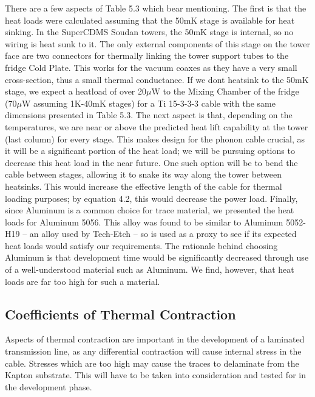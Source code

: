 \documentclass{report}
\begin{document}
\begin{table}[h]
\end{table}


There are a few aspects of Table 5.3 which bear mentioning. The first is that the heat loads were calculated assuming that the 50mK stage is available for heat sinking. In the SuperCDMS Soudan towers, the 50mK stage is internal, so no wiring is heat sunk to it. The only external components of this stage on the tower face are two connectors for thermally linking the tower support tubes to the fridge Cold Plate. This works for the vacuum coaxes as they have a very small cross-section, thus a small thermal conductance. If we dont heatsink to the 50mK stage, we expect a heatload of over 20$\mu$W to the Mixing Chamber of the fridge (70$\mu$W assuming 1K-40mK stages) for a Ti 15-3-3-3 cable with the same dimensions presented in Table 5.3. The next aspect is that, depending on the temperatures, we are near or above the predicted heat lift capability at the tower (last column) for every stage. This makes design for the phonon cable crucial, as it will be a significant portion of the heat load; we will be pursuing options to decrease this heat load in the near future. One such option will be to bend the cable between stages, allowing it to snake its way along the tower between heatsinks. This would increase the effective length of the cable for thermal loading purposes; by equation 4.2, this would decrease the power load. Finally, since Aluminum is a common choice for trace material, we presented the heat loads for Aluminum 5056. This alloy was found to be similar to Aluminum 5052-H19 -- an alloy used by Tech-Etch -- so is used as a proxy to see if its expected heat loads would satisfy our requirements. The rationale behind choosing Aluminum is that development time would be significantly decreased through use of a well-understood material such as Aluminum. We find, however, that heat loads are far too high for such a material.

\subsection{Coefficients of Thermal Contraction}
Aspects of thermal contraction are important in the development of a laminated transmission line, as any differential contraction will cause internal stress in the cable. Stresses which are too high may cause the traces to delaminate from the Kapton substrate. This will have to be taken into consideration and tested for in the development phase.
\end{document}
